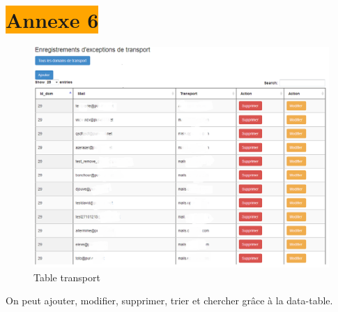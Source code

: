 \section{\colorbox{orange}{Annexe 6}}
\label{transport}
\begin{figure}[!h]
\begin{center}
\includegraphics[width=15cm]{image/table_transport.png}
\end{center}
\caption{Table transport}
\end{figure}
\begin{center}
On peut ajouter, modifier, supprimer, trier et chercher grâce à la data-table.
\end{center}